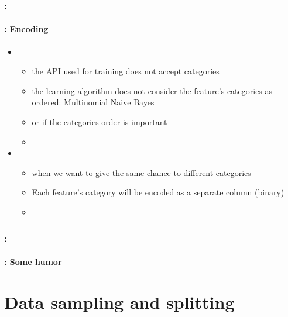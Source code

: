 \documentclass[xcolor=table]{beamer}
\begin{document}
\begin{frame}
	\frametitle{\insertshortsubtitle: \insertsection}
	\framesubtitle{\insertsubsection: Encoding}
	
	\begin{itemize}
		\item {}
		\begin{itemize}
			\item the API used for training does not accept categories
			\item the learning algorithm does not consider the feature's categories as ordered: Multinomial Naive Bayes
			\item or if the categories order is important
			\item {}
		\end{itemize}
	
		\item {}
		\begin{itemize}
			\item when we want to give the same chance to different categories
			\item Each feature's category will be encoded as a separate column (binary)
			\item {}
		\end{itemize}

	\end{itemize}
	
\end{frame}

\begin{frame}
	\frametitle{\insertshortsubtitle: \insertsection}
	\framesubtitle{\insertsubsection: Some humor}
	
	\begin{center}
	\end{center}
	
\end{frame}

\section{Data sampling and splitting}

\begin{frame}
	\frametitle{\insertshortsubtitle}
	\framesubtitle{\insertsection}
	
	
\end{frame}
\end{document}

